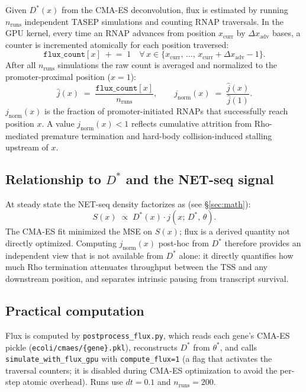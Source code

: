 \documentclass[11pt]{article}
\begin{document}
Given $D^*(x)$ from the CMA-ES deconvolution, flux is estimated by
running $n_{\text{runs}}$ independent TASEP simulations and counting
RNAP traversals. In the GPU kernel, every time an RNAP advances from
position $x_{\text{curr}}$ by $\Delta x_{\text{adv}}$ bases, a counter
is incremented atomically for each position traversed:
\begin{equation}
  \texttt{flux\_count}[x] \;\mathrel{+}=\; 1
  \quad \forall\, x \in \bigl\{x_{\text{curr}},\,\ldots,\,
                               x_{\text{curr}} + \Delta x_{\text{adv}} - 1\bigr\}.
\end{equation}
After all $n_{\text{runs}}$ simulations the raw count is averaged and
normalized to the promoter-proximal position ($x=1$):
\begin{equation}
  \hat{j}(x) \;=\; \frac{\texttt{flux\_count}[x]}{n_{\text{runs}}},
  \qquad
  j_{\text{norm}}(x) \;=\; \frac{\hat{j}(x)}{\hat{j}(1)}.
\end{equation}
$j_{\text{norm}}(x)$ is the fraction of promoter-initiated RNAPs that
successfully reach position $x$. A value $j_{\text{norm}}(x) < 1$
reflects cumulative attrition from Rho-mediated premature termination and
hard-body collision-induced stalling upstream of $x$.

\subsection{Relationship to $D^*$ and the NET-seq signal}

At steady state the NET-seq density factorizes as (see \S\ref{sec:math}):
\begin{equation}
  S(x) \;\propto\; D^*(x)\cdot j(x;\,D^*,\,\theta).
\end{equation}
The CMA-ES fit minimized the MSE on $S(x)$; flux is a derived quantity
not directly optimized. Computing $j_{\text{norm}}(x)$ post-hoc from
$D^*$ therefore provides an independent view that is not available from
$D^*$ alone: it directly quantifies how much Rho termination attenuates
throughput between the TSS and any downstream position, and separates
intrinsic pausing from transcript survival.

\subsection{Practical computation}

Flux is computed by \texttt{postprocess\_flux.py}, which reads each
gene's CMA-ES pickle (\texttt{ecoli/cmaes/\{gene\}.pkl}), reconstructs
$D^*$ from $\theta^*$, and calls \texttt{simulate\_with\_flux\_gpu} with
\texttt{compute\_flux=1} (a flag that activates the traversal counters;
it is disabled during CMA-ES optimization to avoid the per-step atomic
overhead). Runs use $dt = 0.1$ and $n_{\text{runs}} = 200$.
\end{document}
